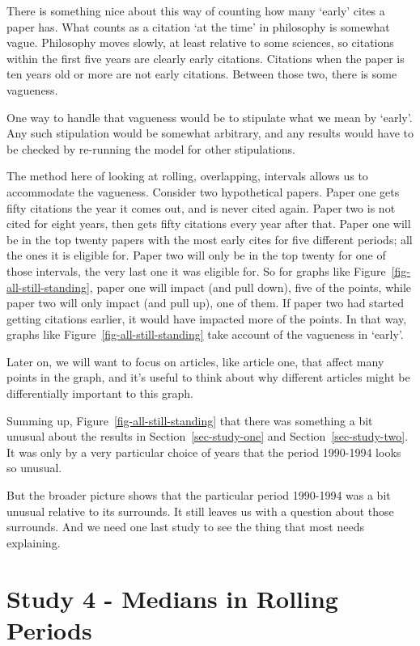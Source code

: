 \documentclass[
  10pt,
  letterpaper,
  DIV=11,
  numbers=noendperiod,
  twoside]{scrartcl}
\begin{document}
There is something nice about this way of counting how many `early'
cites a paper has. What counts as a citation `at the time' in philosophy
is somewhat vague. Philosophy moves slowly, at least relative to some
sciences, so citations within the first five years are clearly early
citations. Citations when the paper is ten years old or more are not
early citations. Between those two, there is some vagueness.

One way to handle that vagueness would be to stipulate what we mean by
`early'. Any such stipulation would be somewhat arbitrary, and any
results would have to be checked by re-running the model for other
stipulations.

The method here of looking at rolling, overlapping, intervals allows us
to accommodate the vagueness. Consider two hypothetical papers. Paper
one gets fifty citations the year it comes out, and is never cited
again. Paper two is not cited for eight years, then gets fifty citations
every year after that. Paper one will be in the top twenty papers with
the most early cites for five different periods; all the ones it is
eligible for. Paper two will only be in the top twenty for one of those
intervals, the very last one it was eligible for. So for graphs like
Figure~\ref{fig-all-still-standing}, paper one will impact (and pull
down), five of the points, while paper two will only impact (and pull
up), one of them. If paper two had started getting citations earlier, it
would have impacted more of the points. In that way, graphs like
Figure~\ref{fig-all-still-standing} take account of the vagueness in
`early'.

Later on, we will want to focus on articles, like article one, that
affect many points in the graph, and it's useful to think about why
different articles might be differentially important to this graph.

Summing up, Figure~\ref{fig-all-still-standing} that there was something
a bit unusual about the results in Section~\ref{sec-study-one} and
Section~\ref{sec-study-two}. It was only by a very particular choice of
years that the period 1990-1994 looks so unusual.

But the broader picture shows that the particular period 1990-1994 was a
bit unusual relative to its surrounds. It still leaves us with a
question about those surrounds. And we need one last study to see the
thing that most needs explaining.

\section{Study 4 - Medians in Rolling Periods}\label{sec-study-four}
\end{document}
